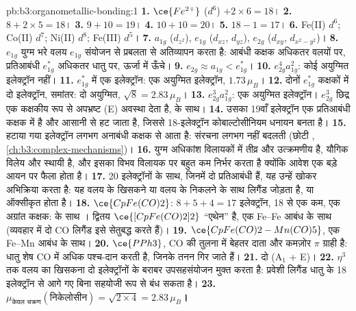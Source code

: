 \begin{solution}{pb:b3:organometallic-bonding:1}
\textbf{1.} $\ce{Fe^{2+}}$ ($d^6$) $+ 2 \times 6 = 18$।
\textbf{2.} $8 + 2 \times 5 = 18$।
\textbf{3.} $9 + 10 = 19$।
\textbf{4.} $10 + 10 = 20$।
\textbf{5.} $18 - 1 = 17$।
\textbf{6.} Fe(II) $d^6$; Co(II) $d^7$; Ni(II) $d^8$; Fe(III) $d^5$।
\textbf{7.} $a_{1g}$ ($d_{z^2}$), $e_{1g}$ ($d_{xz}$, $d_{yz}$), $e_{2g}$ ($d_{xy}$, $d_{x^2-y^2}$)।
\textbf{8.} $e_{1g}$ युग्म भरे वलय $e_{1g}$ संयोजन से प्रबलता से अतिव्यापन करता है: आबंधी
कक्षक अधिकतर वलयों पर, प्रतिआबंधी $e_{1g}^\ast$ अधिकतर धातु पर, ऊर्जा में
ऊँचे।
\textbf{9.} $e_{2g} \approx a_{1g} < e_{1g}^\ast$।
\textbf{10.} $e_{2g}^4a_{1g}^2$: कोई अयुग्मित इलेक्ट्रॉन नहीं।
\textbf{11.} $e_{1g}^\ast$ में एक इलेक्ट्रॉन: एक अयुग्मित इलेक्ट्रॉन, $1.73\,\mu_B$।
\textbf{12.} दोनों $e_{1g}^\ast$ कक्षकों में दो इलेक्ट्रॉन, समांतर: दो अयुग्मित, $\sqrt{8} =
2.83\,\mu_B$।
\textbf{13.} $e_{2g}^3a_{1g}^2$: एक अयुग्मित इलेक्ट्रॉन। $e_{2g}^3$ छिद्र एक कक्षकीय रूप से अपभ्रष्ट
(E) अवस्था देता है,  के साथ।
\textbf{14.} उसका 19वाँ इलेक्ट्रॉन एक प्रतिआबंधी कक्षक में है और आसानी से हट जाता है,
जिससे 18-इलेक्ट्रॉन कोबाल्टोसीनियम धनायन बनता है।
\textbf{15.} हटाया गया इलेक्ट्रॉन लगभग अनाबंधी कक्षक से आता है:
संरचना लगभग नहीं बदलती (छोटी , \cref{ch:b3:complex-mechanisms})।
\textbf{16.} युग्म अधिकांश विलायकों में तीव्र और उत्क्रमणीय है, यौगिक
विलेय और स्थायी है, और इसका विभव विलायक पर बहुत कम निर्भर करता है क्योंकि
आवेश एक बड़े आयन पर फैला होता है।
\textbf{17.} 20 इलेक्ट्रॉनों के साथ, जिनमें दो प्रतिआबंधी हैं, यह उन्हें खोकर अभिक्रिया करता है: यह
वलय के खिसकने या वलय के निकलने के साथ लिगैंड जोड़ता है, या ऑक्सीकृत होता है।
\textbf{18.} $\ce{CpFe(CO)2}$: $8 + 5 + 4 = 17$ इलेक्ट्रॉन, 18 से एक कम, एक अग्रांत कक्षक:  के साथ
। द्वितय $\ce{[CpFe(CO)2]2}$ ``एथेन'' है, एक Fe--Fe आबंध के साथ (व्यवहार में दो CO
लिगैंड इसे सेतुबद्ध करते हैं)।
\textbf{19.} $\ce{CpFe(CO)2-Mn(CO)5}$, एक Fe--Mn आबंध के साथ।
\textbf{20.} $\ce{PPh3}$, CO की तुलना में बेहतर दाता और कमज़ोर $\pi$ ग्राही है: धातु शेष CO में
अधिक पश्च-दान करती है, जिनके तनन गिर जाते हैं।
\textbf{21.} दो (A$_1$ + E)।
\textbf{22.} $\eta^3$ तक वलय का खिसकना दो इलेक्ट्रॉनों के बराबर उपसहसंयोजन मुक्त करता है: प्रवेशी
लिगैंड धातु के 18 इलेक्ट्रॉन से आगे गए बिना सहयोजी रूप से बंध सकता है।
\textbf{23.} \textbf{$\mu_{\text{केवल चक्रण}}(\text{निकेलोसीन}) = \sqrt{2 \times 4} = 2.83\,\mu_B$।}
\end{solution}
